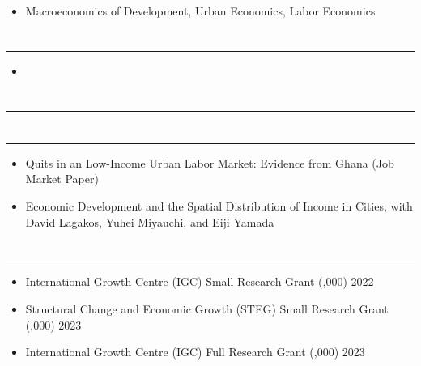 \documentclass[12pt]{article}
\newenvironment{customitemize}
{ \begin{itemize}[leftmargin=\parindent, topsep = 1pt, itemsep = -1pt] }
{\end{itemize} }
\begin{document}
\begin{customitemize}
	\item Macroeconomics of Development, Urban Economics, Labor Economics
\end{customitemize}


\section*{}
\noindent \rule{\textwidth}{1pt} 
\begin{customitemize}
	\item {}
\end{customitemize}

\section*{}
\noindent \rule{\textwidth}{1pt} 

\section*{}
\noindent \rule{\textwidth}{1pt} 
\begin{customitemize}
	\item Quits in an Low-Income Urban Labor Market: Evidence from Ghana (Job Market Paper)
	\item Economic Development and the Spatial Distribution of Income in Cities, with David Lagakos, Yuhei Miyauchi, and Eiji Yamada
\end{customitemize}

\section*{}
\noindent \rule{\textwidth}{1pt} 

\begin{customitemize}
	\item International Growth Centre (IGC) Small Research Grant (,000) \hfill 2022
	\item Structural Change and Economic Growth (STEG) Small Research Grant (,000) \hfill 2023
	\item International Growth Centre (IGC) Full Research Grant (,000) \hfill 2023
\end{customitemize}


\end{document}
